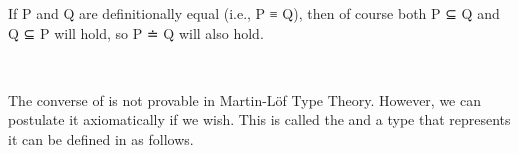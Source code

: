 If \ab P and \ab Q are definitionally equal (i.e., \ab P \aod ≡ \ab Q), then of course both \ab P \aof ⊆ \ab Q and
\ab Q \aof ⊆ \ab P will hold, so \ab P \aof ≐ \ab Q will also hold.
\ccpad
\begin{code}%
\>[0]\AgdaSpace{}%
\AgdaSymbol{:}\AgdaSpace{}%
\AgdaSymbol{\{}\AgdaSpace{}%
\AgdaSpace{}%
\AgdaSymbol{:}\AgdaSpace{}%
\AgdaSpace{}%
\AgdaSpace{}%
\AgdaSymbol{\}}\AgdaSpace{}%
\AgdaSpace{}%
\AgdaSpace{}%
\AgdaSpace{}%
\AgdaSpace{}%
\AgdaSpace{}%
\AgdaSpace{}%
\AgdaSpace{}%
\<%
\\
\>[0]\AgdaSpace{}%
\AgdaSpace{}%
\AgdaSymbol{=}\AgdaSpace{}%
\AgdaSpace{}%
\AgdaSpace{}%
\AgdaSpace{}%
\AgdaSymbol{)}\AgdaSpace{}%
\AgdaOperator{\AgdaInductiveConstructor{,}}\AgdaSpace{}%
\AgdaSpace{}%
\AgdaSpace{}%
\AgdaSpace{}%
\AgdaSymbol{)}\<%
\end{code}
\ccpad
The converse of  is not provable in Martin-L\"of Type Theory. However, we can postulate it axiomatically if we wish. This is called the  and a type that represents it can be defined in \agda as follows.
\ccpad
\begin{code}%
\>[0]\AgdaSpace{}%
\AgdaSymbol{:}\AgdaSpace{}%
\AgdaSpace{}%
\AgdaSpace{}%
\AgdaSpace{}%
\AgdaSymbol{(}\AgdaSpace{}%
\AgdaSymbol{:}\AgdaSpace{}%
\AgdaSymbol{)}\AgdaSpace{}%
\AgdaSpace{}%
\AgdaSpace{}%
\AgdaSpace{}%
\AgdaSpace{}%
\AgdaSpace{}%
\<%
\\
\>[0]\AgdaSpace{}%
\AgdaSpace{}%
\AgdaSpace{}%
\AgdaSymbol{=}\AgdaSpace{}%
\AgdaSpace{}%
\AgdaSymbol{(}\AgdaSpace{}%
\AgdaSpace{}%
\AgdaSymbol{:}\AgdaSpace{}%
\AgdaSpace{}%
\AgdaSpace{}%
\AgdaSymbol{)}\AgdaSpace{}%
\AgdaSpace{}%
\AgdaSpace{}%
\AgdaSpace{}%
\AgdaSpace{}%
\AgdaSpace{}%
\AgdaSpace{}%
\AgdaSpace{}%
\<%
\end{code}
